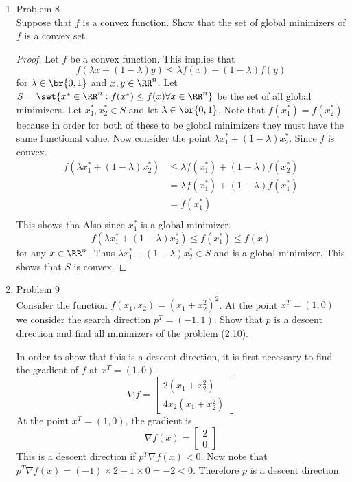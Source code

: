 \documentclass[11pt, oneside]{article}
\begin{document}
\begin{enumerate}
  \item %
    Problem 8 \\
    Suppose that $f$ is a convex function.
    Show that the set of global minimizers of $f$ is a convex set.

    \begin{proof}
      Let $f$ be a convex function.
      This implies that
      \[
        f(\lambda x + (1 - \lambda) y) \le \lambda f(x) + (1 - \lambda) f(y)
      \]
      for $\lambda \in \br{0, 1}$ and $x, y \in \RR^n$.
      Let $S = \set{x^* \in \RR^n : f(x^*) \le f(x) \forall x \in \RR^n}$ be
      the set of all global minimizers.
      Let $x_1^*, x_2^* \in S$ and let $\lambda \in \br{0, 1}$.
      Note that $f(x_1^*) = f(x_2^*)$ because in order for both of these to be
      global minimizers they must have the same functional value.
      Now consider the point $\lambda x_1^* + (1-\lambda)x_2^*$.
      Since $f$ is convex.
      \begin{align*}
        f(\lambda x_1^* + (1-\lambda)x_2^*) &\le \lambda f(x_1^*) + (1 - \lambda) f(x_2^*) \\
        &= \lambda f(x_1^*) + (1 - \lambda) f(x_1^*) \\
        &= f(x_1^*) \\
      \end{align*}
      This shows tha
      Also since $x_1^*$ is a global minimizer.
      \[
        f(\lambda x_1^* + (1-\lambda)x_2^*) \le f(x_1^*) \le f(x)
      \]
      for any $x \in \RR^n$.
      Thus $\lambda x_1^* + (1 - \lambda)x_2^* \in S$ and is a global minimizer.
      This shows that $S$ is convex.
    \end{proof}

  \item %
    Problem 9 \\
    Consider the function $f(x_1, x_2) = (x_1 + x_2^2)^2$.
    At the point $x^T = (1, 0)$ we consider the search direction $p^T = (-1, 1)$.
    Show that $p$ is a descent direction and find all minimizers of the problem
    (2.10).

    In order to show that this is a descent direction, it is first necessary to
    find the gradient of $f$ at $x^T = (1, 0)$.
    \[
      \nabla f =
      \begin{bmatrix}
        2(x_1 + x_2^2) \\
        4x_2(x_1 + x_2^2)
      \end{bmatrix}
    \]
    At the point $x^T = (1, 0)$, the gradient is
    \[
      \nabla f(x) =
      \begin{bmatrix}
        2 \\
        0
      \end{bmatrix}
    \]
    This is a descent direction if $p^T \nabla f(x) < 0$.
    Now note that $p^T \nabla f(x) = (-1)\times 2 + 1 \times 0 = -2 < 0$.
    Therefore $p$ is a descent direction.


\end{enumerate}
\end{document}
